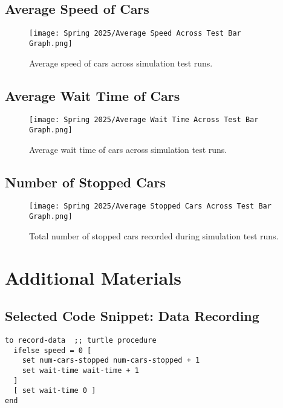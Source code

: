 \documentclass[12pt]{article}
\begin{document}
\subsection{Average Speed of Cars}
\begin{figure}[H]
    \centering
    \texttt{[image: Spring 2025/Average Speed Across Test Bar Graph.png]}
    \caption{Average speed of cars across simulation test runs.}
\end{figure}

\subsection{Average Wait Time of Cars}
\begin{figure}[H]
    \centering
    \texttt{[image: Spring 2025/Average Wait Time Across Test Bar Graph.png]}
    \caption{Average wait time of cars across simulation test runs.}
\end{figure}

\subsection{Number of Stopped Cars}
\begin{figure}[H]
    \centering
    \texttt{[image: Spring 2025/Average Stopped Cars Across Test Bar Graph.png]}
    \caption{Total number of stopped cars recorded during simulation test runs.}
\end{figure}

\newpage
\section{Additional Materials}

\subsection{Selected Code Snippet: Data Recording}
\begin{lstlisting}[language=NetLogo, caption={NetLogo Procedure for Data Collection}]
to record-data  ;; turtle procedure
  ifelse speed = 0 [
    set num-cars-stopped num-cars-stopped + 1
    set wait-time wait-time + 1
  ]
  [ set wait-time 0 ]
end
\end{lstlisting}
\end{document}

